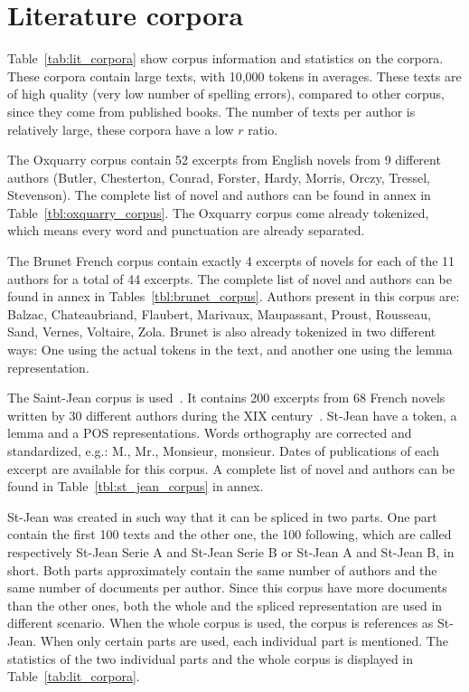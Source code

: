 \section{Literature corpora \label{sec:lit_corpus}}

Table~\ref{tab:lit_corpora} show corpus information and statistics on the corpora.
These corpora contain large texts, with 10,000 tokens in averages.
These texts are of high quality (very low number of spelling errors), compared to other corpus, since they come from published books.
The number of texts per author is relatively large, these corpora have a low $r$ ratio.

The Oxquarry corpus contain 52 excerpts from English novels from 9 different authors (Butler, Chesterton, Conrad, Forster, Hardy, Morris, Orczy, Tressel, Stevenson).
The complete list of novel and authors can be found in annex in Table~\ref{tbl:oxquarry_corpus}.
The Oxquarry corpus come already tokenized, which means every word and punctuation are already separated.

The Brunet French corpus contain exactly 4 excerpts of novels for each of the 11 authors for a total of 44 excerpts.
The complete list of novel and authors can be found in annex in Tables~\ref{tbl:brunet_corpus}.
Authors present in this corpus are: Balzac, Chateaubriand, Flaubert, Marivaux, Maupassant, Proust, Rousseau, Sand, Vernes, Voltaire, Zola.
Brunet is also already tokenized in two different ways: One using the actual tokens in the text, and another one using the lemma representation.

The Saint-Jean corpus is used~\cite{unine_corpus}.
It contains 200 excerpts from 68 French novels written by 30 different authors during the XIX century~\cite{st_jean}.
St-Jean have a token, a lemma and a POS representations.
Words orthography are corrected and standardized, e.g.: M., Mr., Monsieur, monsieur.
Dates of publications of each excerpt are available for this corpus.
A complete list of novel and authors can be found in Table~\ref{tbl:st_jean_corpus} in annex.

St-Jean was created in such way that it can be spliced in two parts.
One part contain the first 100 texts and the other one, the 100 following, which are called respectively St-Jean Serie A and St-Jean Serie B or St-Jean A and St-Jean B, in short.
Both parts approximately contain the same number of authors and the same number of documents per author.
Since this corpus have more documents than the other ones, both the whole and the spliced representation are used in different scenario.
When the whole corpus is used, the corpus is references as St-Jean.
When only certain parts are used, each individual part is mentioned.
The statistics of the two individual parts and the whole corpus is displayed in Table~\ref{tab:lit_corpora}.

